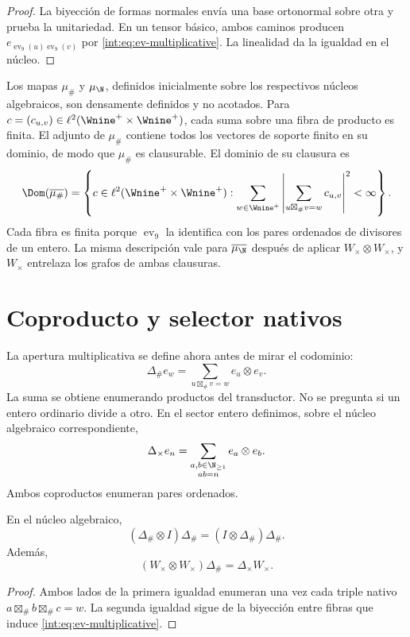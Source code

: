 \begin{proof}
La biyección de formas normales envía una base ortonormal sobre otra y prueba
la unitariedad. En un tensor básico, ambos caminos producen
$e_{\operatorname{ev}_9(u)\operatorname{ev}_9(v)}$ por
\eqref{int:eq:ev-multiplicative}. La linealidad da la igualdad en el núcleo.
\end{proof}

Los mapas $\mu_\#$ y $\mu_{\N}$, definidos inicialmente sobre los respectivos
núcleos algebraicos, son densamente definidos y no acotados. Para
\(c=(c_{u,v})\in\ell^2(\Wnine^+\times\Wnine^+)\), cada suma sobre una fibra de producto
es finita. El adjunto de \(\mu_\#\) contiene todos los vectores de soporte
finito en su dominio, de modo que \(\mu_\#\) es clausurable. El dominio de su
clausura es
\[
 \Dom(\overline{\mu_\#})=
 \left\{c\in\ell^2(\Wnine^+\times\Wnine^+):
 \sum_{w\in\Wnine^+}
 \left|\sum_{u\boxtimes_\#v=w}c_{u,v}\right|^2<\infty
 \right\}.
\]
Cada fibra es finita porque $\operatorname{ev}_9$ la identifica con los pares
ordenados de divisores de un entero. La misma descripción vale para
\(\overline{\mu_{\N}}\) después de aplicar \(W_\times\otimes W_\times\), y
$W_\times$ entrelaza los grafos de ambas clausuras.

\section{Coproducto y selector nativos}

La apertura multiplicativa se define ahora antes de mirar el codominio:
\[
 \Delta_\#e_w
 =\sum_{u\boxtimes_\#v=w}e_u\otimes e_v.
\]
La suma se obtiene enumerando productos del transductor. No se pregunta si
un entero ordinario divide a otro.
En el sector entero definimos, sobre el núcleo algebraico correspondiente,
\[
 \Delta_\times e_n
 =\sum_{\substack{a,b\in\N_{\geq1}\\ab=n}}e_a\otimes e_b.
\]
Ambos coproductos enumeran pares ordenados.

\begin{theorem}
En el núcleo algebraico,
\[
 (\Delta_\#\otimes I)\Delta_\#
 =(I\otimes\Delta_\#)\Delta_\#.
\]
Además,
\[
 (W_\times\otimes W_\times)\Delta_\#
 =\Delta_\times W_\times.
\]
\end{theorem}

\begin{proof}
Ambos lados de la primera igualdad enumeran una vez cada triple nativo
$a\boxtimes_\#b\boxtimes_\#c=w$. La segunda igualdad sigue de la biyección
entre fibras que induce \eqref{int:eq:ev-multiplicative}.
\end{proof}


